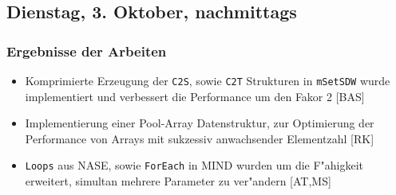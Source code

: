 \documentclass[12pt]{article}
\begin{document}
\subsection{Dienstag, 3. Oktober, nachmittags}

\subsubsection{Ergebnisse der Arbeiten}
\begin{itemize}
\item Komprimierte Erzeugung der \texttt{C2S}, sowie \texttt{C2T} Strukturen in \texttt{mSetSDW} wurde implementiert und
      verbessert die Performance um den Fakor 2 [BAS]
\item Implementierung einer Pool-Array Datenstruktur, zur Optimierung der Performance von  Arrays mit sukzessiv anwachsender Elementzahl [RK] 
\item \texttt{Loops} aus NASE, sowie \texttt{ForEach} in MIND wurden um die F"ahigkeit erweitert, simultan mehrere Parameter zu ver"andern [AT,MS]
\end{itemize}



%
% 
\end{document}
